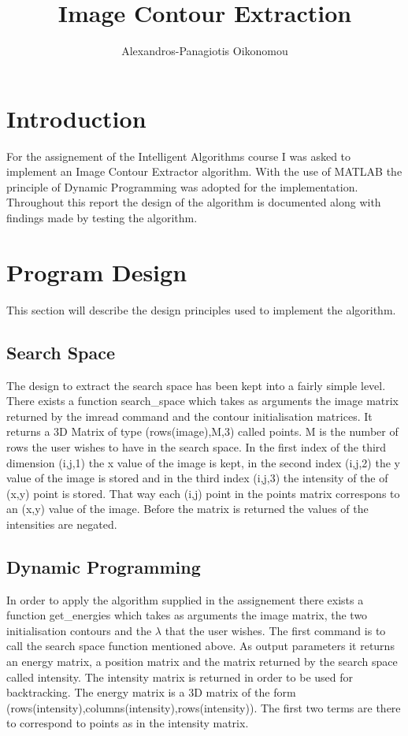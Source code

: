 \documentclass[12pt,a4paper,twocolumn]{article}
\author{Alexandros-Panagiotis Oikonomou}
\title{Image Contour Extraction}
\begin{document}
\maketitle
\newpage
\thispagestyle{empty}
\mbox{}
\newpage
\thispagestyle{empty}
\mbox{}
\newpage
\thispagestyle{empty}
\mbox{}
\section{Introduction}
For the assignement of the Intelligent Algorithms course I was asked to implement an Image Contour Extractor algorithm. With the use of MATLAB the principle of Dynamic Programming was adopted for the implementation. Throughout this report the design of the algorithm is documented along with findings made by testing the algorithm. 
\section{Program Design}
This section will describe the design principles used to implement the algorithm.
\subsection{Search Space}
The design to extract the search space has been kept into a fairly simple level. There exists a function search\_space which takes as arguments the image matrix returned by the imread command and the contour initialisation matrices. It returns a 3D Matrix of type (rows(image),M,3) called points. M is the number of rows the user wishes to have in the search space. In the first index of the third dimension (i,j,1) the x value of the image is kept, in the second index (i,j,2) the y value of the image is stored and in the third index (i,j,3) the intensity of the of (x,y) point is stored. That way each (i,j) point in the points matrix correspons to an (x,y) value of the image. Before the matrix is returned the values of the intensities are negated.
\subsection{Dynamic Programming}
In order to apply the algorithm supplied in the assignement there exists a function get\_energies which takes as arguments the image matrix, the two initialisation contours and the $\lambda$ that the user wishes. The first command is to call the search space function mentioned above. As output parameters it returns an energy matrix, a position matrix and the matrix returned by the search space called intensity. The intensity matrix is returned in order to be used for backtracking. The energy matrix is a 3D matrix of the form (rows(intensity),columns(intensity),rows(intensity)).
The first two terms are there to correspond to points as in the intensity matrix. 
\end{document}
